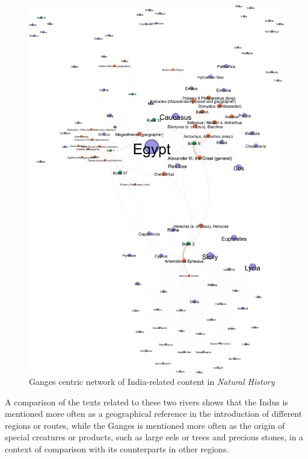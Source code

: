 \documentclass[
  12pt,
]{article}
\begin{document}
\begin{figure}

{\centering \includegraphics{NHthesis_structure_files/figure-pdf/fig-network_ganges-output-1.png}

}

\caption{\label{fig-network_ganges}Ganges centric network of
India-related content in \emph{Natural History}}

\end{figure}

A comparison of the texts related to these two rivers shows that the
Indus is mentioned more often as a geographical reference in the
introduction of different regions or routes, while the Ganges is
mentioned more often as the origin of special creatures or products,
such as large eels or trees and precious stones, in a context of
comparison with its counterparts in other regions.
\end{document}
